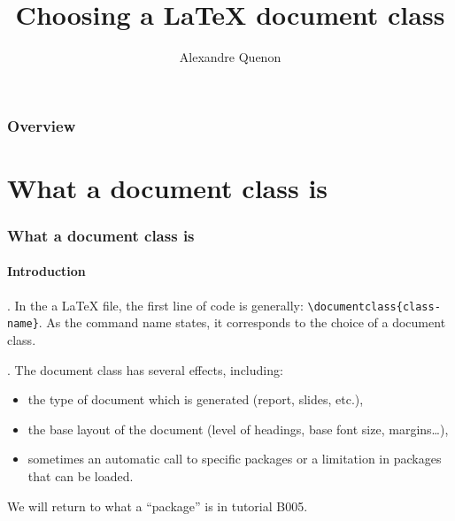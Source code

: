 \documentclass[11pt]{beamer}
\title{Choosing a \LaTeX{} document class}
\author[A. Quenon]{Alexandre Quenon}
\begin{document}
\begin{frame}
	\titlepage
\end{frame}


\begin{frame}
	\frametitle{Overview}
	
	\tableofcontents
\end{frame}


\section{What a document class is}

\begin{frame}[fragile]
	\frametitle{What a document class is}
	\framesubtitle{Introduction}
	
	.
	In the a \LaTeX{} file, the first line of code is generally:
	\verb+\documentclass{class-name}+.
	As the command name states, it corresponds to the choice of a document class.
	
	
	.
	The document class has several effects, including:
	\begin{itemize}
		\item the type of document which is generated (report, slides, etc.),
		\item the base layout of the document (level of headings, base font size, margins\ldots),
		\item sometimes an automatic call to specific packages or a limitation in packages that can be loaded.
	\end{itemize}
	We will return to what a \enquote{package} is in tutorial B005.
\end{frame}
\end{document}
